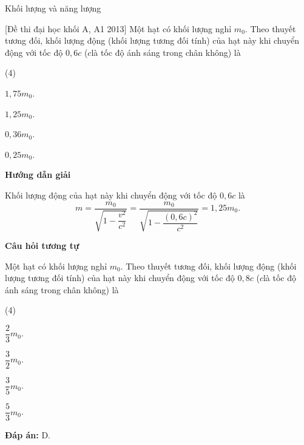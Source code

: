 \begin{dang}{Khối lượng và năng lượng}
		
		{[Đề thi đại học khối A, A1 2013] Một hạt có khối lượng nghỉ $m_0$. Theo thuyết tương đối, khối lượng động (khối lượng tương đối tính) của hạt này khi chuyển động với tốc độ $0,6c$ ($c$là tốc độ ánh sáng trong chân không) là
		\begin{mcq}(4)
			\item $1,75 m_0$.
			\item $1,25 m_0$.
			\item $0,36 m_0$.
			\item $0,25 m_0$.
		\end{mcq}}
		{\begin{center}
			\textbf{Hướng dẫn giải}
		\end{center}
		Khối lượng động của hạt này khi chuyển động với tốc độ $0,6c$ là
		\begin{equation*}
		m=\dfrac{m_0}{\sqrt{1-\dfrac{v^2}{c^2}}}=\dfrac{m_0}{\sqrt{1-\dfrac{(0,6c)^2}{c^2}}}=1,25 m_0.
		\end{equation*}
		
		\begin{center}
			\textbf{Câu hỏi tương tự}
		\end{center}
		
Một hạt có khối lượng nghỉ $m_0$. Theo thuyết tương đối, khối lượng động (khối lượng tương đối tính) của hạt này khi chuyển động với tốc độ $0,8c$ ($c$là tốc độ ánh sáng trong chân không) là
		\begin{mcq}(4)
			\item $\dfrac{2}{3} m_0$.
			\item $\dfrac{3}{2} m_0$.
			\item $\dfrac{3}{5} m_0$.
			\item $\dfrac{5}{3} m_0$.
		\end{mcq}
\textbf{Đáp án:} D.
		}
		

\end{dang}
